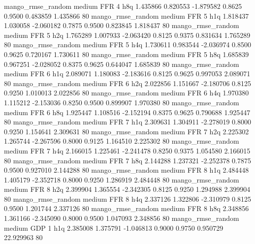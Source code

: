 mango_rmse_random     medium      FFR                 4                  h8q  1.435866 0.820553 -1.879582 0.8625 0.9500  0.483859    1.435866 80
mango_rmse_random     medium      FFR                 5                  h1q  1.818437 1.030058 -2.060182 0.7875 0.9500  0.823845    1.818437 80
mango_rmse_random     medium      FFR                 5                  h2q  1.765289 1.007933 -2.063420 0.8125 0.9375  0.831634    1.765289 80
mango_rmse_random     medium      FFR                 5                  h4q  1.730611 0.983544 -2.036974 0.8500 0.9625  0.720167    1.730611 80
mango_rmse_random     medium      FFR                 5                  h8q  1.685839 0.967251 -2.028052 0.8375 0.9625  0.644047    1.685839 80
mango_rmse_random     medium      FFR                 6                  h1q  2.089071 1.180083 -2.183616 0.8125 0.9625  0.997053    2.089071 80
mango_rmse_random     medium      FFR                 6                  h2q  2.022856 1.151667 -2.180706 0.8125 0.9250  1.010013    2.022856 80
mango_rmse_random     medium      FFR                 6                  h4q  1.970380 1.115212 -2.153036 0.8250 0.9500  0.899907    1.970380 80
mango_rmse_random     medium      FFR                 6                  h8q  1.925447 1.108516 -2.152194 0.8375 0.9625  0.790688    1.925447 80
mango_rmse_random     medium      FFR                 7                  h1q  2.309631 1.304911 -2.278019 0.8000 0.9250  1.154641    2.309631 80
mango_rmse_random     medium      FFR                 7                  h2q  2.225302 1.265744 -2.267596 0.8000 0.9125  1.164510    2.225302 80
mango_rmse_random     medium      FFR                 7                  h4q  2.166015 1.225461 -2.241478 0.8250 0.9375  1.054580    2.166015 80
mango_rmse_random     medium      FFR                 7                  h8q  2.144288 1.237321 -2.252378 0.7875 0.9500  0.927010    2.144288 80
mango_rmse_random     medium      FFR                 8                  h1q  2.484448 1.405179 -2.352718 0.8000 0.9250  1.286919    2.484448 80
mango_rmse_random     medium      FFR                 8                  h2q  2.399904 1.365554 -2.342305 0.8125 0.9250  1.294988    2.399904 80
mango_rmse_random     medium      FFR                 8                  h4q  2.337126 1.322806 -2.310979 0.8125 0.9500  1.201744    2.337126 80
mango_rmse_random     medium      FFR                 8                  h8q  2.348856 1.361166 -2.345090 0.8000 0.9500  1.047093    2.348856 80
mango_rmse_random     medium      GDP                 1                  h1q  2.385008 1.375791 -1.046813 0.9000 0.9750  0.950729   22.929963 80
